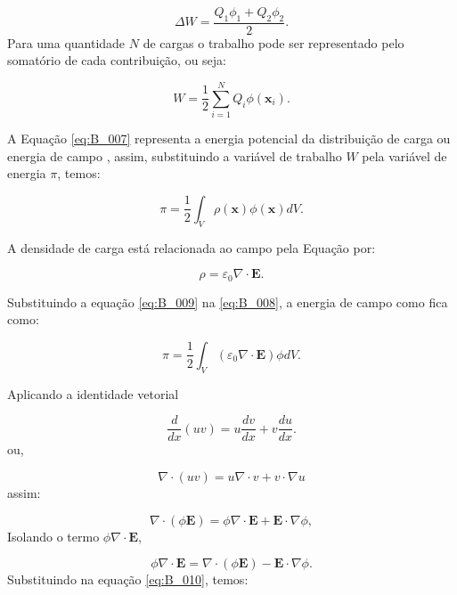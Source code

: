 \documentclass[
12pt,
a4paper,
oneside,
chapter=TITLE,
sumario=tradicional
]{abntex2}
\begin{document}
\begin{equation}
	\Delta W = \frac{Q_1 \phi_1 + Q_2 \phi_2}{2}.  
	\label{eq:B_006}
\end{equation}
Para uma quantidade $N$ de cargas o trabalho pode ser representado pelo somatório de cada contribuição, ou seja:

\begin{equation}
	W = \frac{1}{2} \sum_{i=1}^{N} Q_i \phi(\mathbf{x}_i).  
	\label{eq:B_007}
\end{equation}

A Equação \ref{eq:B_007} representa a energia potencial da distribuição de carga ou energia de campo \cite{humphries2010finite}, assim, substituindo a variável de trabalho $W$ pela variável de energia $\pi$, temos:

\begin{equation}
	\pi= \frac{1}{2} \int_V  \rho(\mathbf{x}) \phi(\mathbf{x}) dV .  
	\label{eq:B_008}
\end{equation}

A densidade de carga está relacionada ao campo pela Equação por:

\begin{equation}
	\rho = \varepsilon_0 \nabla \cdot \mathbf{E}.  
	\label{eq:B_009}
\end{equation}

Substituindo a equação \ref{eq:B_009} na \ref{eq:B_008},  a energia de campo como fica como:

\begin{equation}
	\pi = \frac{1}{2} \int_V   (\varepsilon_0 \nabla \cdot \mathbf{E})  \phi dV.  
	\label{eq:B_010}
\end{equation}

Aplicando a identidade vetorial

\begin{equation*}
	\frac{d}{dx}(uv) = u\frac{dv}{dx} + v\frac{du}{dx}.  
\end{equation*}
ou,

\begin{equation*}
	\nabla \cdot (u v) = u \nabla \cdot v + v \cdot \nabla u 
\end{equation*}
assim:

\begin{equation}
	\nabla \cdot (\phi \mathbf{E}) = \phi \nabla \cdot \mathbf{E} + \mathbf{E} \cdot \nabla \phi,
	\label{eq:B_011}
\end{equation}
Isolando o termo $\phi  \nabla \cdot \mathbf{E}$,

\begin{equation}
	\phi  \nabla \cdot \mathbf{E}  
	= \nabla \cdot (\phi \mathbf{E}) - \mathbf{E} \cdot \nabla \phi.  
	\label{eq:B_012}
\end{equation}
Substituindo na equação \ref{eq:B_010}, temos:
\end{document}

